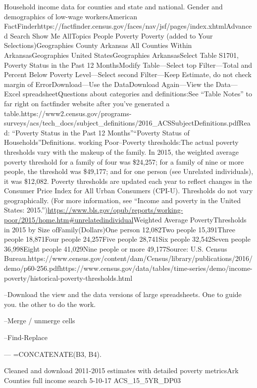 \documentclass[]{book}
\begin{document}
Household income data for counties and state and national. Gender and demographics of low-wage workersAmerican FactFinderhttps://factfinder.census.gov/faces/nav/jsf/pages/index.xhtmlAdvanced Search \textbar{} Show Me AllTopics \textbar{} People \textbar{} Poverty \textbar{} Poverty (added to Your Selections)Geographies \textbar{} County \textbar{} Arkansas \textbar{} All Counties Within ArkansasGeographies \textbar{} United StatesGeographies \textbar{} ArkansasSelect Table S1701, Poverty Status in the Past 12 MonthsModify Table---Select top Filter---Total and Percent Below Poverty Level---Select second Filter---Keep Estimate, do not check margin of ErrorDownload---Use the DataDownload Again---View the Data---Excel spreadsheetQuestions about categories and definitions:See ``Table Notes'' to far right on factfinder website after you've generated a table.https://www2.census.gov/programs-surveys/acs/tech\_docs/subject\_definitions/2016\_ACSSubjectDefinitions.pdfRead: ``Poverty Status in the Past 12 Months''``Poverty Status of Households''Definitions. working Poor--Poverty thresholds:The actual poverty thresholds vary with the makeup of the family. In 2015, the weighted average poverty threshold for a family of four was \$24,257; for a family of nine or more people, the threshold was \$49,177; and for one person (see Unrelated individuals), it was \$12,082. Poverty thresholds are updated each year to reflect changes in the Consumer Price Index for All Urban Consumers (CPI-U). Thresholds do not vary geographically. (For more information, see ``Income and poverty in the United States: 2015.'')\url{https://www.bls.gov/opub/reports/working-poor/2015/home.htm\#unrelatedindividual}Weighted Average PovertyThresholds in 2015 by Size ofFamily(Dollars)One person 12,082Two people 15,391Three people 18,871Four people 24,257Five people 28,741Six people 32,542Seven people 36,998Eight people 41,029Nine people or more 49,177Source: U.S. Census Bureau.https://www.census.gov/content/dam/Census/library/publications/2016/demo/p60-256.pdfhttps://www.census.gov/data/tables/time-series/demo/income-poverty/historical-poverty-thresholds.html

--Download the view and the data versions of large spreadsheets. One to guide you. the other to do the work.

--Merge / unmerge cells

--Find-Replace

--- =CONCATENATE(B3, B4).

Cleaned and download 2011-2015 estimates with detailed poverty metricsArk Counties full income search 5-10-17 ACS\_15\_5YR\_DP03
\end{document}
